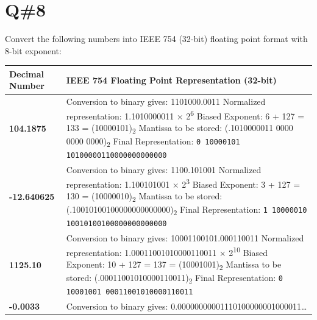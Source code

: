 \vspace{1em}

\section*{Q\#8}
Convert the following numbers into IEEE 754 (32-bit) floating point format with 8-bit exponent:
\begin{center}
\begin{tabular}{|>{\centering\arraybackslash}m{4cm}|>{\arraybackslash}m{10.5cm}|}
\hline
\textbf{Decimal Number} & \textbf{IEEE 754 Floating Point Representation (32-bit)} \\
\hline
\textbf{104.1875} &
Conversion to binary gives: 1101000.0011 \newline
Normalized representation: 1.1010000011 × 2\textsuperscript{6} \newline
Biased Exponent: 6 + 127 = 133 = (10000101)\textsubscript{2} \newline
Mantissa to be stored: (.1010000011 0000 0000 0000)\textsubscript{2} \newline
Final Representation: \newline
\texttt{0 10000101 10100000110000000000000} \\
\hline
\textbf{-12.640625} &
Conversion to binary gives: 1100.101001 \newline
Normalized representation: 1.100101001 × 2\textsuperscript{3} \newline
Biased Exponent: 3 + 127 = 130 = (10000010)\textsubscript{2} \newline
Mantissa to be stored: (.10010100100000000000000)\textsubscript{2} \newline
Final Representation: \newline
\texttt{1 10000010 10010100100000000000000} \\
\hline
\textbf{1125.10} &
Conversion to binary gives: 10001100101.000110011 \newline
Normalized representation: 1.00011001010000110011 × 2\textsuperscript{10} \newline
Biased Exponent: 10 + 127 = 137 = (10001001)\textsubscript{2} \newline
Mantissa to be stored: (.00011001010000110011)\textsubscript{2} \newline
Final Representation: \newline
\texttt{0 10001001 00011001010000110011} \\
\hline
\textbf{-0.0033} &
Conversion to binary gives: 0.00000000001110100000001000011\ldots \newline

\end{tabular}
\end{center}
